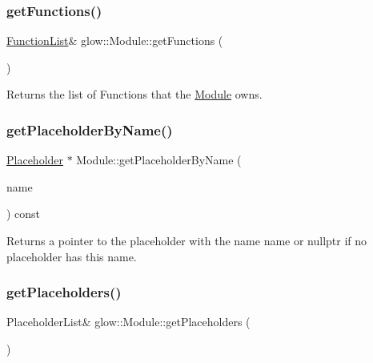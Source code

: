 \subsubsection{\texorpdfstring{get\+Functions()}{getFunctions()}}
{\footnotesize\ttfamily \hyperlink{namespaceglow_ae6f6f350877931e8074457bbab671b5f}{Function\+List}\& glow\+::\+Module\+::get\+Functions (\begin{DoxyParamCaption}{ }\end{DoxyParamCaption})\hspace{0.3cm}{\ttfamily [inline]}}

\begin{DoxyReturn}{Returns}
the list of Functions that the \hyperlink{classglow_1_1_module}{Module} owns. 
\end{DoxyReturn}
\mbox{\label{classglow_1_1_module_a61347fa556eaf4265f5d1d3a9c848a61}} 
\subsubsection{\texorpdfstring{get\+Placeholder\+By\+Name()}{getPlaceholderByName()}}
{\footnotesize\ttfamily \hyperlink{classglow_1_1_placeholder}{Placeholder} $\ast$ Module\+::get\+Placeholder\+By\+Name (\begin{DoxyParamCaption}\item[{llvm\+::\+String\+Ref}]{name }\end{DoxyParamCaption}) const}

\begin{DoxyReturn}{Returns}
a pointer to the placeholder with the name {\ttfamily name} or nullptr if no placeholder has this name. 
\end{DoxyReturn}
\mbox{\label{classglow_1_1_module_a7ea4ac0582c7231b06575b12bd9e7915}} 
\subsubsection{\texorpdfstring{get\+Placeholders()}{getPlaceholders()}}
{\footnotesize\ttfamily Placeholder\+List\& glow\+::\+Module\+::get\+Placeholders (\begin{DoxyParamCaption}{ }\end{DoxyParamCaption})\hspace{0.3cm}{\ttfamily [inline]}}

